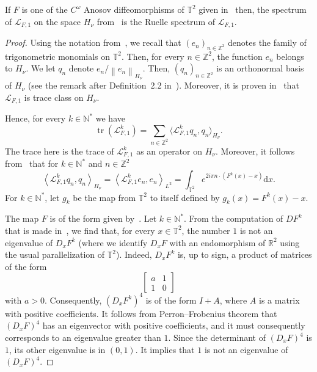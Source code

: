 \documentclass[AHL,Unicode,longabstracts,published]{cedram}
\DeclareMathOperator{\tr}{tr}
\newcommand{\p}[1]{\left(#1\right)}
\newcommand{\n}[1]{\left\|#1\right\|}
\newcommand{\brac}[1]{\langle #1 \rangle}
\newcommand{\clL}{\mathcal{L}}
\newcommand{\bbZ}{\mathbb{Z}}
\newcommand{\bbT}{\mathbb{T}}
\newcommand{\bbN}{\mathbb{N}}
\newcommand{\bbR}{\mathbb{R}}
\newcommand{\rmd}{\mathrm{d}}
\newcommand*{\MK}{\mkern 2mu}
\begin{document}
\begin{lemm}\label{lemma:lesmemes}
If $F$ is one of the $C^\omega$ Anosov diffeomorphisms of $\bbT^2$ given in~\cite[Theorem~1.3$\MK$(i)]{optimal_examples} then, the spectrum of $\clL_{F,1}$ on the space $H_\nu$ from~\cite[Theorem~1.3]{optimal_examples} is the Ruelle spectrum of $\clL_{F,1}$.
\end{lemm}

\begin{proof}
Using the notation from~\cite{optimal_examples}, we recall that $(e_n)_{n \in \bbZ^2}$ denotes the family of trigonometric monomials on $\bbT^2$. Then, for every $n \in \bbZ^2$, the function $e_n$ belongs to $H_\nu$. We let $q_n$ denote $e_n / \n{e_n}_{H_\nu}$. Then, $(q_n)_{n \in \bbZ^2}$ is an orthonormal basis of $H_\nu$ (see the remark after Definition~2.2 in~\cite{optimal_examples}). Moreover, it is proven in~\cite{optimal_examples} that $\clL_{F,1}$ is trace class on $H_\nu$.

Hence, for every $k \in \bbN^*$ we have
\begin{equation*}
\tr \p{\clL_{F,1}^k} = \sum_{n \in \bbZ^2} \brac{\clL_{F,1}^k q_n, q_n }_{H_\nu}.
\end{equation*}
The trace here is the trace of $\clL_{F,1}^k$ as an operator on $H_\nu$. Moreover, it follows from~\cite[Remark~4.7]{optimal_examples} that for $k \in \bbN^*$ and $n \in \bbZ^2$
\begin{equation*}
\left\langle\clL_{F,1}^k q_n, q_n\right\rangle_{H_\nu} = \left\langle\clL_{F,1}^k e_n, e_n\right\rangle_{L^2} = \int_{\bbT^2} e^{2 i \pi n \cdot \left(F^k(x) - x\right)} \rmd x.
\end{equation*}
For $k \in \bbN^*$, let $g_k$ be the map from $\bbT^2$ to itself defined by $g_k(x) = F^k(x) -x$.

The map $F$ is of the form given by~\cite[(19)]{optimal_examples}. Let $k \in \bbN^*$. From the computation of $D F^k$ that is made in~\cite[Proposition~5.5]{optimal_examples}, we find that, for every $x \in \bbT^2$, the number $1$ is not an eigenvalue of $D_xF^k$ (where we identify $D_xF$ with an endomorphism of $\bbR^2$ using the usual parallelization of $\bbT^2$). Indeed, $D_x F^k$ is, up to sign, a product of matrices of the form
\begin{equation*}
\left[
\begin{array}{cc}
a & 1 \\ 1 & 0
\end{array}\right]
\end{equation*}
with $a > 0$. Consequently, $(D_x F^k)^4$ is of the form $I + A$, where $A$ is a matrix with positive coefficients. It follows from Perron--Frobenius theorem that $(D_x F)^4$ has an eigenvector with positive coefficients, and it must consequently corresponds to an eigenvalue greater than $1$. Since the determinant of $(D_x F)^4$ is $1$, its other eigenvalue is in $(0,1)$. It implies that $1$ is not an eigenvalue of $(D_x F)^4$.


\end{proof}
\end{document}
